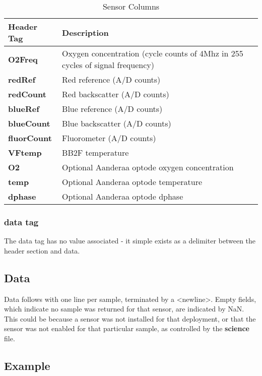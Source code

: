 \documentclass[12pt,english,twoside]{book}
\providecommand{\tabularnewline}{\\}
\begin{document}
%
\begin{table}
\begin{centering}\begin{tabular}{|l|p{4.5in}|}
\hline 
\textbf{Header Tag} &
\textbf{Description} \tabularnewline
\hline 
\textbf{O2Freq} &
Oxygen concentration (cycle counts of 4Mhz in 255 cycles of signal
frequency)\tabularnewline
\hline 
\textbf{redRef} &
Red reference (A/D counts)\tabularnewline
\hline 
\textbf{redCount} &
Red backscatter (A/D counts)\tabularnewline
\hline 
\textbf{blueRef} &
Blue reference (A/D counts)\tabularnewline
\hline 
\textbf{blueCount} &
Blue backscatter (A/D counts)\tabularnewline
\hline 
\textbf{fluorCount} &
Fluorometer (A/D counts)\tabularnewline
\hline 
\textbf{VFtemp} &
BB2F temperature\tabularnewline
\hline 
\textbf{O2} &
Optional Aanderaa optode oxygen concentration\tabularnewline
\hline 
\textbf{temp} &
Optional Aanderaa optode temperature\tabularnewline
\hline 
\textbf{dphase} &
Optional Aanderaa optode dphase\tabularnewline
\hline
\end{tabular}\par\end{centering}


\caption{Sensor Columns}

\label{SensorColumns} 
\end{table}



\subsubsection{data tag}

The data tag has no value associated - it simple exists as a delimiter
between the header section and data.


\subsection{Data}

Data follows with one line per sample, terminated by a <newline>.
Empty fields, which indicate no sample was returned for that sensor,
are indicated by NaN. This could be because a sensor was not installed
for that deployment, or that the sensor was not enabled for that particular
sample, as controlled by the \textbf{science} file.\newpage{}


\subsection{Example}
\end{document}
